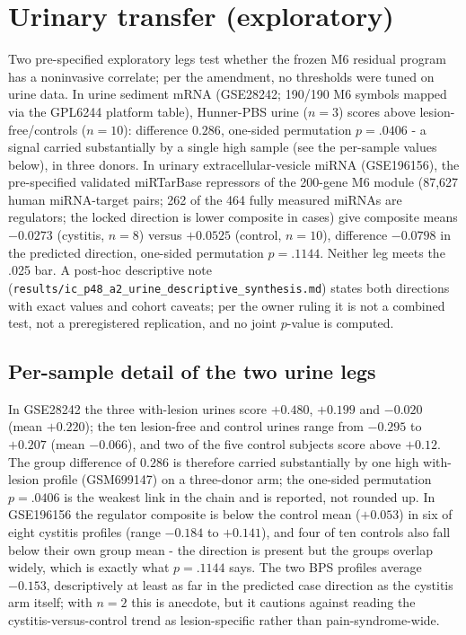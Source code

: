 \documentclass[11pt,a4paper]{article}
\begin{document}
\section{Urinary transfer (exploratory)}
Two pre-specified exploratory legs test whether the frozen M6 residual program
has a noninvasive correlate; per the amendment, no thresholds were tuned on
urine data. In urine sediment mRNA (GSE28242; 190/190 M6 symbols mapped via the
GPL6244 platform table), Hunner-PBS urine ($n=3$) scores above
lesion-free/controls ($n=10$): difference $0.286$, one-sided permutation
$p=.0406$ - a signal carried substantially by a single high sample (see the
per-sample values below), in three donors. In urinary extracellular-vesicle miRNA (GSE196156), the pre-specified
validated miRTarBase repressors of the 200-gene M6 module (87,627 human
miRNA-target pairs; 262 of the 464 fully measured miRNAs are regulators; the
locked direction is lower composite in cases) give composite means $-0.0273$
(cystitis, $n=8$) versus $+0.0525$ (control, $n=10$), difference $-0.0798$ in
the predicted direction, one-sided permutation $p=.1144$. Neither leg meets the
.025 bar. A post-hoc descriptive note
(\texttt{results/ic\_p48\_a2\_urine\_descriptive\_synthesis.md}) states both
directions with exact values and cohort caveats; per the owner ruling it is not
a combined test, not a preregistered replication, and no joint $p$-value is
computed.

\subsection{Per-sample detail of the two urine legs}
In GSE28242 the three with-lesion urines score $+0.480$, $+0.199$ and $-0.020$
(mean $+0.220$); the ten lesion-free and control urines range from $-0.295$ to
$+0.207$ (mean $-0.066$), and two of the five control subjects score above
$+0.12$. The group difference of $0.286$ is therefore carried substantially by
one high with-lesion profile (GSM699147) on a three-donor arm; the one-sided
permutation $p=.0406$ is the weakest link in the chain and is reported, not
rounded up. In GSE196156 the regulator composite is below the control mean
($+0.053$) in six of eight cystitis profiles (range $-0.184$ to $+0.141$), and
four of ten controls also fall below their own group mean - the direction is
present but the groups overlap widely, which is exactly what $p=.1144$ says.
The two BPS profiles average $-0.153$, descriptively at least as far in the
predicted case direction as the cystitis arm itself; with $n=2$ this is
anecdote, but it cautions against reading the cystitis-versus-control trend as
lesion-specific rather than pain-syndrome-wide.
\end{document}
